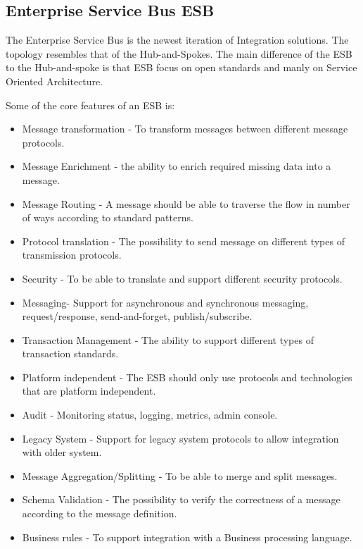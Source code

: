 \documentclass{llncs}
\begin{document}
\subsection{Enterprise Service Bus ESB}
The Enterprise Service Bus is the newest iteration of Integration solutions. The topology resembles that of the Hub-and-Spokes. The main difference of the ESB to the Hub-and-spoke is that ESB focus on open standards and manly on Service Oriented Architecture.

Some of the core features of an ESB is:
\begin{itemize}
\item Message transformation - To transform messages between different message protocols.
\item Message Enrichment - the ability to enrich required missing data into a message.
\item Message Routing - A message should be able to traverse the flow in number of ways according to standard patterns.
\item Protocol translation - The possibility to send message on different types of transmission protocols.
\item Security - To be able to translate and support different security protocols.
\item Messaging- Support for asynchronous and synchronous messaging, request/response, send-and-forget, publish/subscribe.
\item Transaction Management - The ability to support different types of transaction standards.
\item Platform independent - The ESB should only use protocols and technologies that are platform independent.
\item Audit - Monitoring status, logging, metrics, admin console.
\item Legacy System - Support for legacy system protocols to allow integration with older system.
\item Message Aggregation/Splitting - To be able to merge and split messages.
\item Schema Validation - The possibility to verify the correctness of a message according to the message definition.
\item Business rules - To support integration with a Business processing language.
\end{itemize}
\end{document}
